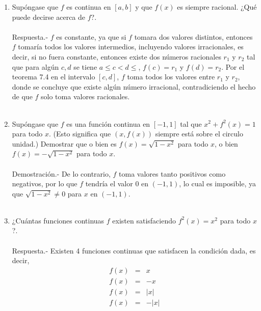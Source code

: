 \begin{enumerate}
\begin{enumerate}[\bfseries (a)]
    \end{enumerate}

\item Supóngase que $f$ es continua en $[a,b]$ y que $f(x)$ es siempre racional. ¿Qué puede decirse acerca de $f$?.\\\\
    Respuesta.-\; $f$ es constante, ya que si $f$ tomara dos valores distintos, entonces $f$ tomaría todos los valores intermedios, incluyendo valores irracionales, es decir, si no fuera constante, entonces existe dos números racionales $r_1$ y $r_2$ tal que para algún $c,d$ se tiene $a\leq c<d\leq$, $f(c)=r_1$ y $f(d) = r_2$. Por el teorema 7.4 en el intervalo $[c,d]$, $f$ toma todos los valores entre $r_1$ y $r_2$, donde se concluye que existe algún número irracional, contradiciendo el hecho de que $f$ solo toma valores racionales.\\\\

\item Supóngase que $f$ es una función continua en $[-1,1]$ tal que $x^2+f^2(x) = 1$ para todo $x$. (Esto significa que $(x,f(x))$ siempre está sobre el circulo unidad.) Demostrar que o bien es $f(x)=\sqrt{1-x^2}$ para todo $x$, o bien $f(x)=-\sqrt{1-x^2}$ para todo $x$.\\\\
    Demostración.-\; De lo contrario, $f$ toma valores tanto positivos como negativos, por lo que $f$ tendría el valor $0$ en  $(-1, 1)$, lo cual es imposible, ya que $\sqrt{1-x^2} \neq 0$ para $x$ en $(-1,1)$.\\\\ 
 

\item ¿Cuántas funciones continuas $f$ existen satisfaciendo $f^2(x)=x^2$ para todo $x$?.\\\\
    Respuesta.-\; Existen 4 funciones continuas que satisfacen la condición dada, es decir,
    $$\begin{array}{rcl}
	f(x)&=&x\\
	f(x)&=&-x\\
	f(x)&=&|x|\\
	f(x)&=&-|x|\\\\
    \end{array}$$


\end{enumerate}
